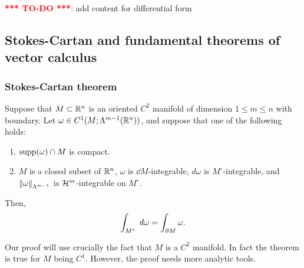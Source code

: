 \documentclass[a4paper]{article}
\newcommand{\TODO}{\textcolor{red}{\textbf{*** TO-DO ***}}}
\begin{document}
\TODO: add content for differential form

\subsection{Stokes-Cartan and fundamental theorems
of vector calculus}

\subsubsection{Stokes-Cartan theorem}

\begin{thm}
Suppose that $M \subset \mathbb{R}^n$ is an oriented $C^2$ manifold
of dimension $1 \leq m \leq n$ with boundary. Let $\omega
\in C^1 (M; \Lambda^{m-1} (\mathbb{R}^n))$, and suppose that one of
the following holds:
\begin{enumerate}
  \item $\operatorname{supp} (\omega) \cap M$ is compact.
  \item $M$ is a closed subset of $\mathbb{R}^n$, $\omega$ is
  $\dd M$-integrable, $d \omega$ is $M^\circ$-integrable,
  and $\left\lVert \omega\right\rVert_{\Lambda^{m-1}}$ is $\mathcal{H}^m$-integrable
  on $M^\circ$.
\end{enumerate}
Then,
\[
\int_{M^\circ} \; d \omega = \int_{\partial M} \omega.
\]
\end{thm}

\begin{remark}
Our proof will use crucially the fact that $M$ is a $C^2$
manifold. In fact the theorem is true for $M$ being
$C^1$. However, the proof needs more analytic tools.
\end{remark}
\end{document}
